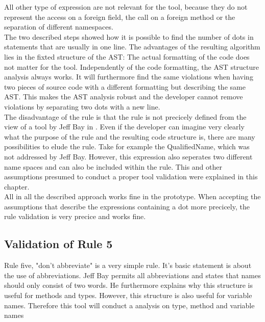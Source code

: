 All other type of expression are not relevant for the tool, because they do not represent the access on a foreign field, the call on a foreign method or the separation of different namespaces.
\\

The two described steps showed how it is possible to find the number of dots in statements that are usually in one line.
The advantages of the resulting algorithm lies in the fixted structure of the \ac{AST}: The actual formatting of the code does not matter for the tool. Independently of the code formatting, the \ac{AST} structure analysis always works. It will furthermore find the same violations when having two pieces of source code with a different formatting but describing the same \ac{AST}. This makes the \ac{AST} analysis robust and the developer cannot remove violations by separating two dots with a new line.
\\

The disadvantage of the rule is that the rule is not precicely defined from the view of a tool by Jeff Bay in \cite{oc2008}. Even if the developer can imagine very clearly what the purpose of the rule and the resulting code structure is, there are many possibilities to elude the rule. Take for example the QualifiedName, which was not addressed by Jeff Bay. However, this expression also seperates two different name spaces and can also be included within the rule. This and other assumptions presumed to conduct a proper tool validation were explained in this chapter. 
\\

All in all the described approach works fine in the prototype. When accepting the assumptions that describe the expressions containing a dot more precicely, the rule validation is very precice and works fine.
\\

\subsection*{Validation of Rule 5}
Rule five, "don't abbreviate" is a very simple rule. It's basic statement is about the use of abbreviations.
Jeff Bay permits all abbreviations and states that names should only consist of two words. He furthermore explains why this structure is useful for methods and types. However, this structure is also useful for variable names. Therefore this tool will conduct a analysis on type, method and variable names
\\

